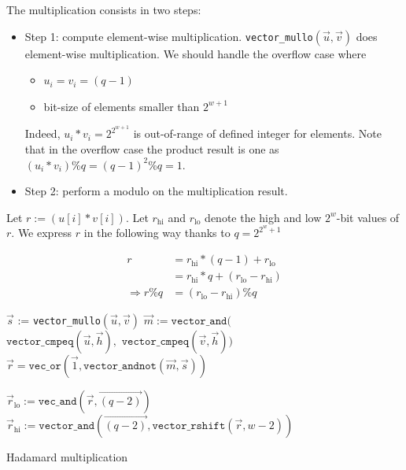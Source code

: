 \documentclass[oneside,9pt]{article}
\begin{document}
The multiplication consists in two steps:
\begin{itemize}
\item Step 1: compute element-wise multiplication.
	\texttt{vector\_mullo}$(\vec{u}, \vec{v})$ does element-wise multiplication. We should handle the overflow case where
	\begin{itemize}
		\item $u_i = v_i = (q-1)$
		\item bit-size of elements smaller than $2^{w+1}$
	\end{itemize}
	Indeed, $u_i * v_i = 2^{2^{w+1}}$ is out-of-range of defined integer for elements.
	Note that in the overflow case the product result is one as $(u_i * v_i) \% q = (q-1)^2 \% q = 1$.
\item Step 2: perform a modulo on the multiplication result.
\end{itemize}
Let $r := (u[i]* v[i])$. Let $r_{\text{hi}}$ and $r_{\text{lo}}$ denote the high and low $2^w$-bit values of $r$.
We express $r$ in the following way thanks to $q = 2^{2^{w} + 1}$

\begin{equation}
\begin{split}
r &= r_{\text{hi}} * (q-1) + r_{\text{lo}} \\
  &= r_{\text{hi}} * q + (r_{\text{lo}} - r_{\text{hi}}) \\
\Rightarrow r \% q &= (r_{\text{lo}} - r_{\text{hi}}) \% q
\end{split}
\end{equation}

\begin{algorithm}[]
 $\vec{s}$ := \texttt{vector\_mullo}$(\vec{u}, \vec{v})$\;
 $\vec{m} := \texttt{vector\_and}($\\
	$\texttt{vector\_cmpeq}(\vec{u}, \vec{h}),$
	$\texttt{vector\_cmpeq}(\vec{v}, \vec{h}))$\;
 $\vec{r} = \texttt{vec\_or}(\vec{1}, \texttt{vector\_andnot}(\vec{m}, \vec{s}))$\;
 
 $\vec{r}_{\text{lo}} := \texttt{vec\_and}(\vec{r}, \overrightarrow{(q-2)})$\;
 $\vec{r}_{\text{hi}} := \texttt{vector\_and}(\overrightarrow{(q-2)}, \texttt{vector\_rshift}(\vec{r}, w-2))$\;
 \caption{Hadamard multiplication}
\end{algorithm}
\end{document}
